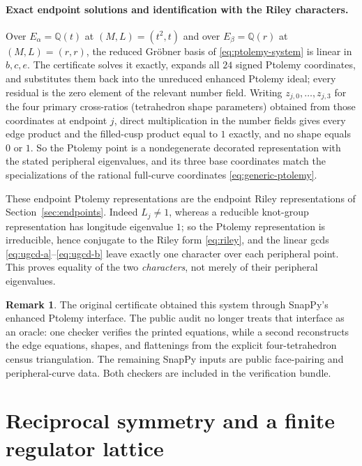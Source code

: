 \documentclass[11pt]{article}
\theoremstyle{definition}
\newtheorem{remark}{Remark}
\newcommand{\Q}{\mathbb{Q}}
\begin{document}
\paragraph{Exact endpoint solutions and identification with the Riley characters.}
Over $E_\alpha=\Q(t)$ at $(M,L)=(t^2,t)$ and over $E_\beta=\Q(r)$ at
$(M,L)=(r,r)$, the reduced Gr\"obner basis of \eqref{eq:ptolemy-system} is linear
in $b,c,e$.  The certificate solves it exactly, expands all $24$ signed Ptolemy
coordinates, and substitutes them back into the unreduced enhanced Ptolemy ideal;
every residual is the zero element of the relevant number field.  Writing
$z_{j,0},\dots,z_{j,3}$ for the four primary cross-ratios (tetrahedron shape
parameters) obtained from those coordinates at endpoint $j$, direct
multiplication in the number fields gives every edge product and the filled-cusp
product equal to $1$ exactly, and no shape equals $0$ or $1$.  So the Ptolemy
point is a nondegenerate decorated representation with the stated peripheral
eigenvalues, and its three base coordinates match the specializations of the
rational full-curve coordinates \eqref{eq:generic-ptolemy}.

These endpoint Ptolemy representations are the endpoint Riley representations of
Section~\ref{sec:endpoints}.  Indeed $L_j\ne1$, whereas a reducible knot-group
representation has longitude eigenvalue $1$; so the Ptolemy representation is
irreducible, hence conjugate to the Riley form \eqref{eq:riley}, and the linear
gcds \eqref{eq:ugcd-a}--\eqref{eq:ugcd-b} leave exactly one character over each
peripheral point.  This proves equality of the two \emph{characters}, not merely
of their peripheral eigenvalues.

\begin{remark}
The original certificate obtained this system through SnapPy's enhanced
Ptolemy interface.  The public audit no longer treats that interface as an
oracle: one checker verifies the printed equations, while a second reconstructs
the edge equations, shapes, and flattenings from the explicit four-tetrahedron
census triangulation.  The remaining SnapPy inputs are public face-pairing and
peripheral-curve data.  Both checkers are included in the verification bundle.
\end{remark}

\section{Reciprocal symmetry and a finite regulator lattice}\label{sec:torsion}
\end{document}
